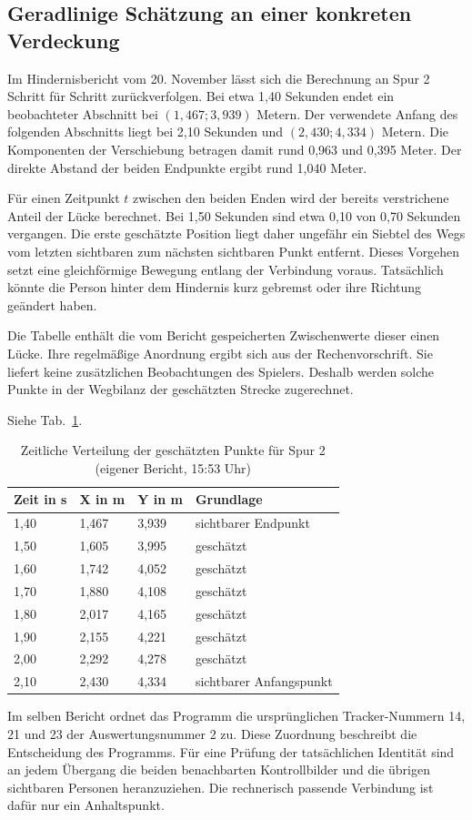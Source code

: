 \subsection{Geradlinige Schätzung an einer konkreten Verdeckung}
Im Hindernisbericht vom 20. November lässt sich die Berechnung an Spur 2 Schritt für Schritt zurückverfolgen. Bei etwa 1,40 Sekunden endet ein beobachteter Abschnitt bei $(1{,}467;3{,}939)$ Metern. Der verwendete Anfang des folgenden Abschnitts liegt bei 2,10 Sekunden und $(2{,}430;4{,}334)$ Metern. Die Komponenten der Verschiebung betragen damit rund 0,963 und 0,395 Meter. Der direkte Abstand der beiden Endpunkte ergibt rund 1,040 Meter.

Für einen Zeitpunkt $t$ zwischen den beiden Enden wird der bereits verstrichene Anteil der Lücke berechnet. Bei 1,50 Sekunden sind etwa 0,10 von 0,70 Sekunden vergangen. Die erste geschätzte Position liegt daher ungefähr ein Siebtel des Wegs vom letzten sichtbaren zum nächsten sichtbaren Punkt entfernt. Dieses Vorgehen setzt eine gleichförmige Bewegung entlang der Verbindung voraus. Tatsächlich könnte die Person hinter dem Hindernis kurz gebremst oder ihre Richtung geändert haben.

Die Tabelle enthält die vom Bericht gespeicherten Zwischenwerte dieser einen Lücke. Ihre regelmäßige Anordnung ergibt sich aus der Rechenvorschrift. Sie liefert keine zusätzlichen Beobachtungen des Spielers. Deshalb werden solche Punkte in der Wegbilanz der geschätzten Strecke zugerechnet.

Siehe Tab.~\ref{tab:em-interpol}.
\begin{table}[htbp]\centering\caption{Zeitliche Verteilung der geschätzten Punkte für Spur 2 (eigener Bericht, 15:53 Uhr)}\label{tab:em-interpol}
\begin{tabular}{@{}llll@{}}\toprule Zeit in s & X in m & Y in m & Grundlage\\\midrule
1,40 & 1,467 & 3,939 & sichtbarer Endpunkt\\
1,50 & 1,605 & 3,995 & geschätzt\\
1,60 & 1,742 & 4,052 & geschätzt\\
1,70 & 1,880 & 4,108 & geschätzt\\
1,80 & 2,017 & 4,165 & geschätzt\\
1,90 & 2,155 & 4,221 & geschätzt\\
2,00 & 2,292 & 4,278 & geschätzt\\
2,10 & 2,430 & 4,334 & sichtbarer Anfangspunkt\\\bottomrule\end{tabular}\end{table}
Im selben Bericht ordnet das Programm die ursprünglichen Tracker-Nummern 14, 21 und 23 der Auswertungsnummer 2 zu. Diese Zuordnung beschreibt die Entscheidung des Programms. Für eine Prüfung der tatsächlichen Identität sind an jedem Übergang die beiden benachbarten Kontrollbilder und die übrigen sichtbaren Personen heranzuziehen. Die rechnerisch passende Verbindung ist dafür nur ein Anhaltspunkt.
\clearpage

